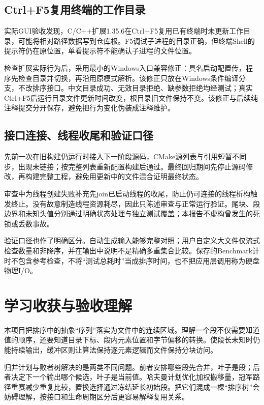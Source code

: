 \subsection{Ctrl+F5复用终端的工作目录}
实际GUI验收发现，C/C++扩展1.35.6在Ctrl+F5复用已有终端时未更新工作目录，可能将相对路径数据写到仓库根。F5调试子进程的目录正确，但终端Shell的提示符仍在原位置，单看提示符不能确认子进程的文件位置。

检查扩展实际行为后，采用最小的Windows入口兼容修正：具名启动配置传，程序先检查目录并切换，再沿用原模式解析。该修正只放在Windows条件编译分支，不改排序接口。中文目录成功、无效目录拒绝、缺参数拒绝均经测试；真实Ctrl+F5后运行目录文件更新时间改变，根目录旧文件保持不变。该修正与后续纯注释提交分开保存，避免把行为变化伪装成注释维护。

\subsection{接口连接、线程收尾和验证口径}
先前一次在旧构建仍运行时接入下一阶段源码，CMake源列表与引用短暂不同步，出现未链接；按完整列表重新配置构建后通过。最终回归期间先停止源码修改，再构建完整工程，避免用更新中的文件混合证明最终状态。

审查中为线程创建失败补充先join已启动线程的收尾，防止仍可连接的线程析构触发终止。没有故意制造线程资源耗尽，因此只陈述审查与正常运行验证。尾块、段边界和未知头值分别通过明确状态处理与独立测试覆盖；本报告不虚构曾发生的死锁或丢数事故。

验证口径也作了明确区分。自动生成输入能够完整对照；用户自定义大文件仅流式检查数量和非降序，并在输出中说明不是精确多重集合比较。保存的Benchmark计时不包含参考检查，不将“测试总耗时”当成排序时间，也不把应用层调用称为硬盘物理I/O。

\section{学习收获与验收理解}
本项目把排序中的抽象“序列”落实为文件中的连续区域。理解一个段不仅需要知道值的顺序，还要知道目录下标、段内元素位置和字节偏移的转换。使段长未知时仍能持续输出，缓冲区则让算法保持逐元素逻辑而文件保持分块访问。

归并计划与败者树解决的是两类不同问题。前者安排哪些段先合并，叶子是段；后者决定下一个输出哪个候选，叶子是当前值。哈夫曼计划优化加权搬移量，冠军路径重赛减少重复比较，置换选择通过冻结延长初始段。把它们混成一棵“排序树”会妨碍理解，按接口和生命周期区分后更容易解释复用关系。

